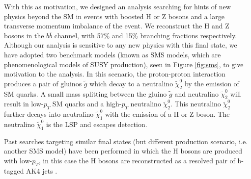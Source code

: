 With this as motivation, we designed an analysis searching for hints of new physics beyond the SM in events with boosted H or Z bosons and a large transverse momentum imbalance of the event. We reconstruct the H and Z bosons in the $b\bar{b}$ channel, with 57\% and 15\% branching fractions respectively. Although our analysis is sensitive to any new physics with this final state, we have adopted two benchmark models (known as SMS models\cite{CMS-SUS-11-016}, which are phenomenological models of SUSY production), seen in Figure \ref{fig:sms}, to give motivation to the analysis. In this scenario, the proton-proton interaction produces a pair of gluinos $\tilde{g}$ which decay to a neutralino $\tilde{\chi}_{2}^{0}$ by the emission of SM quarks. A small mass splitting between the gluino $\tilde{g}$ and neutralino $\tilde{\chi}_{2}^{0}$ will result in low-$p_{T}$ SM quarks and a high-$p_{T}$ neutralino $\tilde{\chi}_{2}^{0}$. This neutralino $\tilde{\chi}_{2}^{0}$ further decays into neutralino $\tilde{\chi}_{1}^{0}$ with the emission of a H or Z boson. The neutralino $\tilde{\chi}_{1}^{0}$ is the LSP and escapes detection. 
 
Past searches targeting similar final states (but different production scenario, i.e. another SMS model) have been performed in which the H bosons are produced with low-$p_{T}$, in this case the H bosons are reconstructed as a resolved pair of b-tagged AK4 jets \cite{CMS-SUS-16-044}.
 
